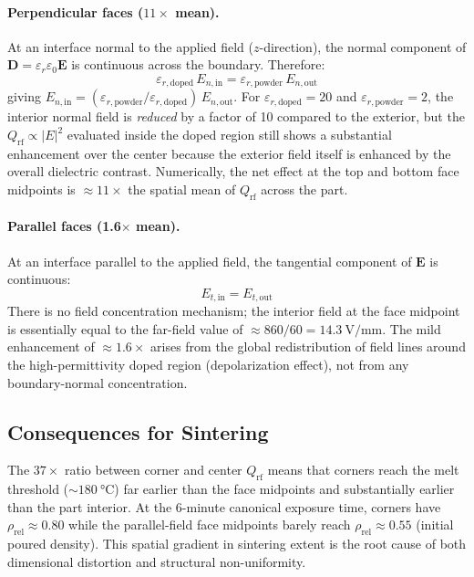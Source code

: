 \documentclass[10pt,twocolumn]{article}
\newcommand{\Qrf}{Q_{\mathrm{rf}}}
\newcommand{\rhorel}{\rho_{\mathrm{rel}}}
\newcommand{\vect}[1]{\boldsymbol{#1}}
\begin{document}
\paragraph{Perpendicular faces ($11\times$ mean).}
At an interface normal to the applied field ($z$-direction), the normal
component of $\vect{D} = \varepsilon_r\varepsilon_0\vect{E}$ is
continuous across the boundary.  Therefore:
\begin{equation}
  \varepsilon_{r,\mathrm{doped}}\,E_{n,\mathrm{in}} =
  \varepsilon_{r,\mathrm{powder}}\,E_{n,\mathrm{out}}
  \label{eq:normal_D_continuity}
\end{equation}
giving $E_{n,\mathrm{in}} = (\varepsilon_{r,\mathrm{powder}} /
\varepsilon_{r,\mathrm{doped}})\,E_{n,\mathrm{out}}$.  For
$\varepsilon_{r,\mathrm{doped}} = 20$ and $\varepsilon_{r,\mathrm{powder}} = 2$,
the interior normal field is \emph{reduced} by a factor of 10 compared
to the exterior, but the $\Qrf \propto |E|^{2}$ evaluated inside the
doped region still shows a substantial enhancement over the center
because the exterior field itself is enhanced by the overall
dielectric contrast.  Numerically, the net effect at the top and
bottom face midpoints is $\approx 11\times$ the spatial mean of
$\Qrf$ across the part.

\paragraph{Parallel faces (1.6$\times$ mean).}
At an interface parallel to the applied field, the tangential component
of $\vect{E}$ is continuous:
\begin{equation}
  E_{t,\mathrm{in}} = E_{t,\mathrm{out}}
  \label{eq:tangential_E_continuity}
\end{equation}
There is no field concentration mechanism; the interior field at the
face midpoint is essentially equal to the far-field value of
$\approx 860/60 = \SI{14.3}{\volt\per\milli\meter}$.  The mild
enhancement of $\approx 1.6\times$ arises from the global redistribution
of field lines around the high-permittivity doped region
(depolarization effect), not from any boundary-normal concentration.

\subsection{Consequences for Sintering}

The $37\times$ ratio between corner and center $\Qrf$ means that
corners reach the melt threshold ($\sim\SI{180}{\celsius}$) far earlier
than the face midpoints and substantially earlier than the part
interior.  At the 6-minute canonical exposure time, corners have
$\rhorel \approx 0.80$ while the parallel-field face midpoints barely
reach $\rhorel \approx 0.55$ (initial poured density).  This spatial
gradient in sintering extent is the root cause of both dimensional
distortion and structural non-uniformity.
\end{document}
